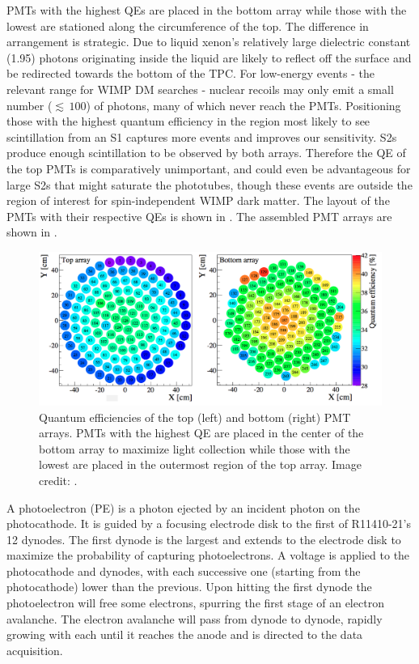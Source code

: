 PMTs with the highest QEs are placed in the bottom array while those with the lowest are stationed along the circumference of the
top.  The difference in arrangement is strategic.  Due to liquid xenon's relatively large dielectric constant (1.95) photons
originating inside the liquid are likely to
reflect off the surface and be redirected towards the bottom of the TPC.  For low-energy events - the relevant range for WIMP DM
searches - nuclear recoils may only emit a small number (${\lesssim}\, 100$) of photons, many of which never reach the PMTs.  Positioning
those with the highest quantum efficiency in the region most likely to see scintillation from an S1 captures more events and improves our
sensitivity.  S2s produce enough scintillation to be observed by both arrays.  Therefore the QE of the top PMTs is comparatively
unimportant, and could even be advantageous for large S2s that might saturate the phototubes, though these events are outside the region
of interest for spin-independent WIMP dark matter.  The layout of the PMTs with their respective QEs is shown
in .  The assembled PMT arrays are shown in .

\begin{figure}
\centering
\includegraphics[width=\textwidth]{PMTQuantumEfficiency}
\caption[Quantum efficiencies of the top and bottom PMT arrays.]{Quantum efficiencies of the top (left) and bottom (right) PMT arrays.  PMTs
with the highest QE are placed in the center of the bottom
array to maximize light collection while those with the lowest are placed in the outermost region of the top array.  Image credit:
.}
\label{fig:xenon1t_pmt_qe}
\end{figure}

A photoelectron (PE) is a photon ejected by an incident photon on the photocathode.  It is guided by a focusing electrode disk to the
first of R11410-21's 12 dynodes.  The first dynode is the largest and extends to the electrode disk
to maximize the probability of capturing photoelectrons.  A voltage is applied to the photocathode and dynodes,
with each successive one (starting from the photocathode) lower than the previous.  Upon hitting the first dynode the photoelectron will
free some electrons, spurring the first stage of an electron avalanche.  The electron avalanche will pass from dynode to dynode, rapidly
growing with each until it reaches the anode and is directed to the data acquisition.

